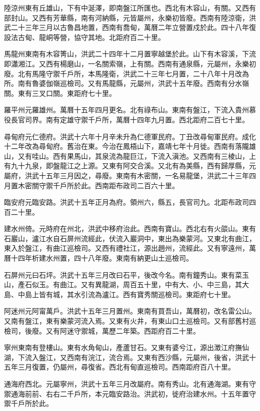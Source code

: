 陸涼州東有丘雄山，下有中涎澤，即南盤江所匯也。西北有木容山，有關。又西有部封山。又西有芳華縣，南有河納縣，元皆屬州，永樂初皆廢。西南有陸涼衛，洪武二十三年三月以古魯昌地置，西南有喬甸，萬曆二年立營置戍於此。四十八年復設法古甸、龍峒等營，協守其地。北距府百二十里。

馬龍州東南有木容箐山，洪武二十四年十二月置寧越堡於此。山下有木容溪，下流即瀟湘江。又西有楊磨山，一名關索嶺，上有關。西南有通泉縣，元屬州，永樂初廢。北有馬隆守禦千戶所，本馬隆衛，洪武二十三年七月置，二十八年十月改為所。南有魯婆伽嶺巡檢司。又有馬龍縣，元屬州，洪武十五年廢。西南有分水嶺關。東有三叉口關。東距府七十里。

羅平州元羅雄州。萬曆十五年四月更名。北有祿布山。東南有盤江，下流入貴州慕役長官司界。南有定雄守禦千戶所，萬曆十四年九月置。西北距府二百七十里。

尋甸府元仁德府。洪武十六年十月辛未升為仁德軍民府。丁丑改尋甸軍民府。成化十二年改為尋甸府。舊治在東。今治在鳳梧山下，嘉靖七年十月徙。西南有落隴雄山，又有哇山。西有果馬山，其泉流為龍巨江，下流入滇池。又西南有三棱山，上有九十九泉，即盤龍江之上源。又東有阿交合溪。又北有為美縣，西有歸厚縣，元屬府，洪武十五年三月因之，尋廢。東南有木密關，一名易龍堡，洪武二十三年四月置木密關守禦千戶所於此。西南距布政司二百六十里。

臨安府元臨安路。洪武十五年正月為府。領州六，縣五，長官司九。北距布政司四百二十里。

建水州倚。元時府在州北，洪武中移府治此。西南有寶山。西北右有火燄山。東有石巖山，瀘江水自石屏州流經此，伏流入巖洞中，東出為樂蒙河。又東北有曲江，東入於盤江，有曲江巡檢司。又西有禮社江，源出趙州，流經此。又有寧遠州，萬曆十四年析建水州置，四十八年廢。東南有納更山土巡檢司。

石屏州元曰石坪。洪武十五年三月改曰石平，後改今名。南有鐘秀山。東有菜玉山，產石似玉。有曲江。又有異龍湖，周百五十里，中有大、小、中三島，其大島、中島上皆有城，其水引流為瀘江。西有寶秀關巡檢司。東距府七十里。

阿迷州元阿甯萬戶。洪武十五年三月置州。東南有買吾山，萬曆初，改名雷公山。又南有盤江，東有樂蒙河流入焉。又東有火井，有東山口土巡檢司。又有部舊村巡檢司，後廢。又有阿迷守禦城，萬歷二年築。西距府百二十里。

寧州東南有登樓山。東有水角甸山，產蘆甘石。又東有婆兮江，源出澂江府撫仙湖，下流入盤江，又西南有浣江，流合焉。又東有西沙縣，元屬州，後省，洪武十五年三月復置，仍屬州，尋復省。西北有甸直巡檢司。西南距府百八十里。

通海府西北。元屬寧州，洪武十五年三月改屬府。南有秀山。北有通海湖。東有守禦通海前前、右右二千戶所，本元臨安路治。洪武初，徙府治建水州。十五年置守禦千戶所於此。

